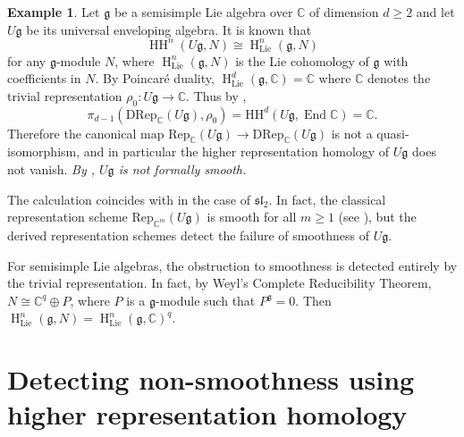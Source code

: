 \documentclass{article}
\numberwithin{equation}{section} %
\theoremstyle{plain}
\theoremstyle{definition}
\newtheorem{example}[theorem]{Example}
\theoremstyle{remark}
\begin{document}
\begin{example}\label{Example_UniversalEnveloping}
Let $\mathfrak{g}$ be a semisimple Lie algebra over $\mathbb{C}$ of dimension $d\geq2$ and let $U\mathfrak{g}$ be its universal enveloping algebra.
It is known that
\begin{equation*}
\operatorname{HH}^n(U\mathfrak{g},N)\cong\operatorname{H}_{\mathrm{Lie}}^n(\mathfrak{g},N)
\end{equation*}
for any $\mathfrak{g}$-module $N$, where $\operatorname{H}_{\mathrm{Lie}}^n(\mathfrak{g},N)$ is the Lie cohomology of $\mathfrak{g}$ with coefficients in $N$.
By Poincar\'e duality, $\operatorname{H}_{\mathrm{Lie}}^d(\mathfrak{g},\mathbb{C})=\mathbb{C}$ where $\mathbb{C}$ denotes the trivial representation $\rho_0:U\mathfrak{g}\to\mathbb{C}$.
Thus by ,
\begin{equation*}
\pi_{d-1}(\mathrm{DRep}_{\mathbb{C}}(U\mathfrak{g}),\rho_0)=\mathrm{HH}^d(U\mathfrak{g},\operatorname{End}\mathbb{C})=\mathbb{C}.
\end{equation*}
Therefore the canonical map $\mathrm{Rep}_{\mathbb{C}}(U\mathfrak{g})\to\mathrm{DRep}_{\mathbb{C}}(U\mathfrak{g})$ is not a quasi-isomorphism, and in particular the higher representation homology of $U\mathfrak{g}$ does not vanish.
\emph{By , $U\mathfrak{g}$ is not formally smooth.}

The calculation coincides with \cite[Example 2.3]{BKR13} in the case of $\mathfrak{sl}_2$.
In fact, the classical representation scheme $\mathrm{Rep}_{\mathbb{C}^m}(U\mathfrak{g})$ is smooth for all $m\geq1$ (see \cite[Theorem 3.4, Remark 4.7]{AGV16}), but the derived representation schemes detect the failure of smoothness of $U\mathfrak{g}$.

For semisimple Lie algebras, the obstruction to smoothness is detected entirely by the trivial representation.
In fact, by Weyl's Complete Reducibility Theorem, $N\cong\mathbb{C}^q\oplus P$, where $P$ is a $\mathfrak{g}$-module such that $P^{\mathfrak{g}}=0$.
Then $\operatorname{H}_{\mathrm{Lie}}^n(\mathfrak{g},N)=\operatorname{H}_{\mathrm{Lie}}^n(\mathfrak{g},\mathbb{C})^q$.
\end{example}

\section{Detecting non-smoothness using higher representation homology}\label{Sec_ExQ}
\end{document}
